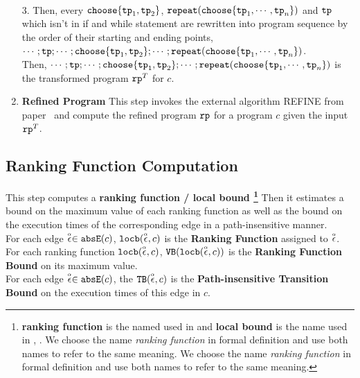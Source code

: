\begin{enumerate}
\\
3. Then, every $\rpchoose{\tpath_1, \tpath_2 }$,  $\rprepeat(\rpchoose{\tpath_1, \cdots, \tpath_n})$ 
and $\mathtt{tp}$ which isn't in if and while statement 
are rewritten into program sequence  by the order of their starting and ending points,
$\cdots; \tpath;\cdots;  \rpchoose{\tpath_1, \tpath_2 }; \cdots; \rprepeat(\rpchoose{\tpath_1, \cdots, \tpath_n})$.
\\
Then, $\cdots; \tpath;\cdots;  \rpchoose{\tpath_1, \tpath_2 }; \cdots; \rprepeat(\rpchoose{\tpath_1, \cdots, \tpath_n})$
is the transformed program $\mathtt{rp}^{T}$ for $c$.
%
\item \textbf{Refined Program}
This step invokes the external algorithm REFINE from paper~\cite{GulwaniJK09} and compute the 
refined program $\mathtt{rp}$ for a program $c$ given the input $\mathtt{rp}^{T}$.
\end{enumerate}
\subsection{Ranking Function Computation}
\label{sec:ranking}
This step computes a 
\textbf{ranking function / local bound
\footnote{\textbf{ranking function} is the named used in \cite{SinnZV14}
and \textbf{local bound} is the name used in \cite{ZulegerGSV11}, \cite{sinn2017complexity}.
We choose the name \emph{ranking function} in formal definition and use both names to refer to the same meaning.
We choose the name \emph{ranking function} in formal definition and use both names to refer to the same meaning.
}}
Then it estimates a bound on the maximum value of each ranking function as well as
the bound on the execution times of the corresponding edge in a path-insensitive manner.
\\
For each edge $\stackrel{\scriptscriptstyle{\alpha}}{\mathtt{\epsilon}{}} \in \mathtt{abs}{\mathtt{E}}(c)$,
$\mathtt{locb}(\stackrel{\scriptscriptstyle{\alpha}}{\mathtt{\epsilon}{}}, c)$ is the \textbf{Ranking Function} assigned to $\stackrel{\scriptscriptstyle{\alpha}}{\mathtt{\epsilon}{}}$.
\\
For each ranking function $\mathtt{locb}(\stackrel{\scriptscriptstyle{\alpha}}{\mathtt{\epsilon}{}}, c)$, ${\mathtt{VB}}(\mathtt{locb}(\stackrel{\scriptscriptstyle{\alpha}}{\mathtt{\epsilon}{}}, c))$ is
the \textbf{Ranking Function Bound} on its maximum value.
\\
For each edge $\stackrel{\scriptscriptstyle{\alpha}}{\mathtt{\epsilon}{}} \in \mathtt{abs}{\mathtt{E}}(c)$, the ${\mathtt{TB}}(\stackrel{\scriptscriptstyle{\alpha}}{\mathtt{\epsilon}{}}, c)$ is the \textbf{Path-insensitive Transition Bound}
on the execution times of this edge in $c$.
%
